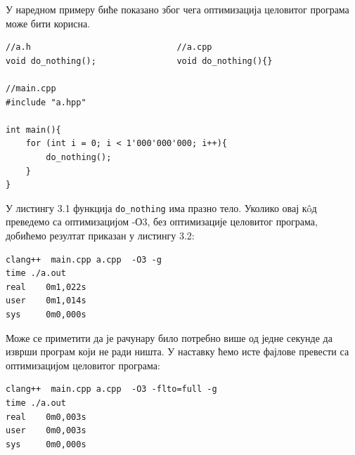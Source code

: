 \documentclass[12pt,oneside]{memoir}
\begin{document}
У наредном примеру биће показано због чега оптимизација целовитог програма 
може бити корисна.

\begin{lstlisting}[frame=single,caption={Primer pozivanja funkcije bez tela}, captionpos=b]
//a.h                             //a.cpp
void do_nothing();                void do_nothing(){} 

//main.cpp          
#include "a.hpp"

int main(){
    for (int i = 0; i < 1'000'000'000; i++){
        do_nothing();
    }
}
\end{lstlisting}

У листингу 3.1  функција  \texttt{do{\_}nothing} има празно тело.
Уколико овај к\^{o}д преведемо са оптимизацијом -О3, без оптимизације целовитог програма, добићемо  резултат приказан у листингу 3.2:

\begin{lstlisting}[frame=single, caption={Rezultat bez optimizacije celovitog programa}, captionpos=b]
clang++  main.cpp a.cpp  -O3 -g
time ./a.out 
real    0m1,022s
user    0m1,014s
sys     0m0,000s
\end{lstlisting}

Може се приметити да је рачунару било потребно више од једне секунде да изврши програм који не ради ништа.
У наставку ћемо исте фајлове превести са оптимизацијом целовитог програма:
\begin{lstlisting}[frame=single, caption={Rezultat sa optimizacijom celovitog programa}, captionpos=b]
clang++  main.cpp a.cpp  -O3 -flto=full -g
time ./a.out 
real    0m0,003s
user    0m0,003s
sys     0m0,000s
\end{lstlisting}
\end{document}

